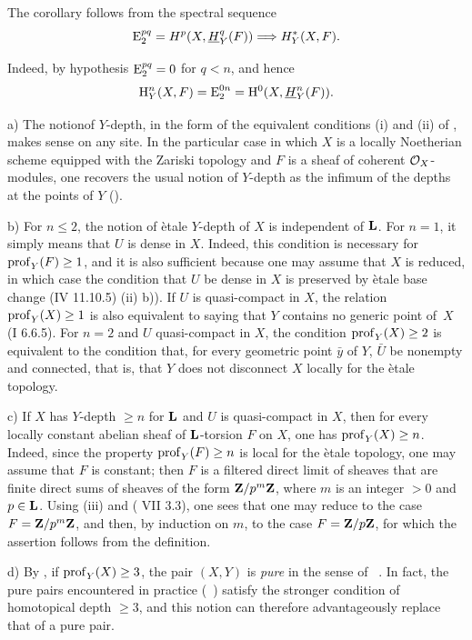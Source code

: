 The corollary follows from the spectral sequence
$$
\operatorname{E}_2^{pq}=H^p(X, {\mathop{\underline{H}}\nolimits}_Y^q(F))\Longrightarrow H_Y^*(X, F).
$$

Indeed, by hypothesis $\operatorname{E}_2^{pq}=0$ for $q<n$, and hence
$$
\mathrm H_Y^n(X, F)=\operatorname{E}_2^{0n}=\mathrm H^0(X, {\mathop{\underline{H}}\nolimits}_Y^n(F)).
$$

\skpt
\begin{remarques} \label{XIV.1.6}
a) The notion\pageoriginale of $Y$-depth, in the form of the equivalent conditions \textup{(i)} and \textup{(ii)} of , makes sense on any site. In the particular case in which $X$ is a locally Noetherian scheme equipped with the Zariski topology and $F$ is a sheaf of coherent $\mathcal O_X$-modules, one recovers the usual notion of $Y$-depth as the infimum of the depths at the points of $Y$ ().

b) For $n\leq 2$, the notion of \`etale $Y$-depth of $X$ is independent of $\mathbf L$. For $n=1$, it simply means that $U$ is dense in $X$. Indeed, this condition is necessary for $\operatorname{prof}_Y(F)\geq 1$, and it is also sufficient because one may assume that $X$ is reduced, in which case the condition that $U$ be dense in $X$ is preserved by \`etale base change \textup{(\EGA IV 11.10.5) \textup{(ii)} b))}. If $U$ is quasi-compact in $X$, the relation $\operatorname{prof}_Y(X)\geq 1$ is also equivalent to saying that $Y$ contains no generic point of~$X$ (\EGA I 6.6.5). For $n=2$ and $U$ quasi-compact in $X$, the condition $\operatorname{prof}_Y(X)\geq 2$ is equivalent to the condition that, for every geometric point $\bar y$ of $Y$, $\bar U$ be nonempty and connected, that is, that \og $Y$ does not disconnect $X$ locally for the \`etale topology\fg.

c) If $X$ has $Y$-depth $\geq n$ for $\mathbf L$ and $U$ is quasi-compact in $X$, then for every locally constant abelian sheaf of $\mathbf L$-torsion $F$ on $X$, one has $\operatorname{prof}_Y(X)\geq n$. Indeed, since the property $\operatorname{prof}_Y(F)\geq n$ is local for the \`etale topology, one may assume that $F$ is constant; then $F$ is a filtered direct limit of sheaves that are finite direct sums of sheaves of the form $\mathbf Z/p^m\mathbf Z$, where $m$ is an integer $>0$ and $p\in \mathbf L$. Using  \textup{(iii)} and \textup{( VII 3.3)}, one sees that one may reduce to the case $F=\mathbf Z/p^m\mathbf Z$, and then\pageoriginale, by induction on $m$, to the case $F=\mathbf Z/p\mathbf Z$, for which the assertion follows from the definition.

d) By , if $\operatorname{prof}_Y(X)\geq 3$, the pair $(X, Y)$ is \textit{pure} in the sense of ~. In fact, the pure pairs encountered in practice (\cf {}~) satisfy the stronger condition of homotopical depth $\geq 3$, and this notion can therefore advantageously replace that of a pure pair.


\end{remarques}
